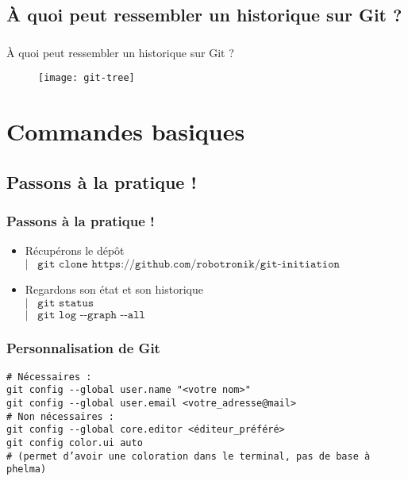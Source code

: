 \documentclass[9pt,a9paper,handout]{beamer}
\newcommand{\command}[1]{$\left|\;\;\;\texttt{#1}\right.$}
\begin{document}
\subsection{À quoi peut ressembler un historique sur Git ?}
\begin{frame}
\frametitle{}{À quoi peut ressembler un historique sur Git ?}
\begin{figure}
    \begin{center}
        \texttt{[image: git-tree]}
    \end{center}
\end{figure}
\end{frame}

\section{Commandes basiques}
\subsection{Passons à la pratique !}
\begin{frame}
\frametitle{Passons à la pratique !}
\begin{itemize}
    \item Récupérons le dépôt\\\command{git clone https://github.com/robotronik/git-initiation}
    \item Regardons son état et son historique\\
    \command{git status}\\
    \command{git log -{}-graph -{}-all}
\end{itemize}
\end{frame}

\begin{frame}
\frametitle{Personnalisation de Git}
\texttt{\# Nécessaires :\\
git config -{}-global user.name "<votre nom>"\\
git config -{}-global user.email <votre\_adresse@mail>\\
\# Non nécessaires :\\
git config -{}-global core.editor <éditeur\_préféré>\\
git config color.ui auto\\
\# (permet d'avoir une coloration dans le terminal, pas de base à phelma)
}
\end{frame}
\end{document}
